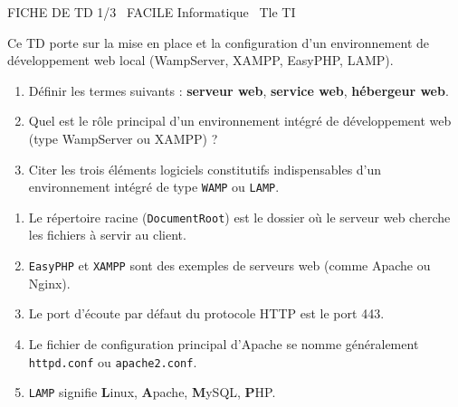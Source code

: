 \documentclass[11pt]{article}
\begin{document}
\begin{tcolorbox}[enhanced,colback=popink,colframe=popink,arc=10pt,boxrule=0pt,left=12pt,right=12pt,top=9pt,bottom=9pt]
{\color{white}\popxbold\small FICHE DE TD 1/3 \textbullet\ FACILE \hfill Informatique \textbullet\ Tle TI\par}
\end{tcolorbox}
\vspace{4pt}
Ce TD porte sur la mise en place et la configuration d'un environnement de développement web local (WampServer, XAMPP, EasyPHP, LAMP).

\begin{exercice}
\begin{enumerate}
    \item Définir les termes suivants : \textbf{serveur web}, \textbf{service web}, \textbf{hébergeur web}.
    \item Quel est le rôle principal d'un environnement intégré de développement web (type WampServer ou XAMPP) ?
    \item Citer les trois éléments logiciels constitutifs indispensables d'un environnement intégré de type \texttt{WAMP} ou \texttt{LAMP}.
\end{enumerate}
\end{exercice}

\begin{exercice}
\begin{enumerate}
    \item Le répertoire racine (\texttt{DocumentRoot}) est le dossier où le serveur web cherche les fichiers à servir au client.
    \item \texttt{EasyPHP} et \texttt{XAMPP} sont des exemples de serveurs web (comme Apache ou Nginx).
    \item Le port d'écoute par défaut du protocole HTTP est le port 443.
    \item Le fichier de configuration principal d'Apache se nomme généralement \texttt{httpd.conf} ou \texttt{apache2.conf}.
    \item \texttt{LAMP} signifie \textbf{L}inux, \textbf{A}pache, \textbf{M}ySQL, \textbf{P}HP.
\end{enumerate}
\end{exercice}
\end{document}
